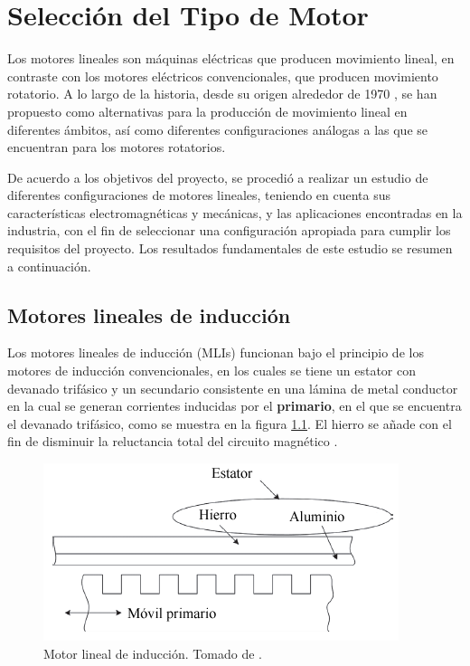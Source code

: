 \chapter{Selección del Tipo de Motor}

Los motores lineales son máquinas eléctricas que producen movimiento lineal, en contraste con los motores eléctricos convencionales, que producen movimiento rotatorio. A lo largo de la historia, desde su origen alrededor de 1970 \cite{laithwaite1970}, se han propuesto como alternativas para la producción de movimiento lineal en diferentes ámbitos, así como diferentes configuraciones análogas a las que se encuentran para los motores rotatorios.

De acuerdo a los objetivos del proyecto, se procedió a realizar un estudio de diferentes configuraciones de motores lineales, teniendo en cuenta sus características electromagnéticas y mecánicas, y las aplicaciones encontradas en la industria, con el fin de seleccionar una configuración apropiada para cumplir los requisitos del proyecto. Los resultados fundamentales de este estudio se resumen a continuación.

\section{Motores lineales de inducción}
Los motores lineales de inducción (MLIs) funcionan bajo el principio de los motores de inducción convencionales, en los cuales se tiene un estator con devanado trifásico y un secundario consistente en una lámina de metal conductor en la cual se generan corrientes inducidas por el \textbf{primario}, en el que se encuentra el devanado trifásico, como se muestra en la figura \ref{lim1}. El hierro se añade con el fin de disminuir la reluctancia total del circuito magnético \cite{guru2001}.

\begin{figure}[hbtp]
\centering
\includegraphics[scale=0.5]{../img/lim1.png}
\caption{Motor lineal de inducción. Tomado de \cite{boldea2013}.}
\label{lim1}
\end{figure}

